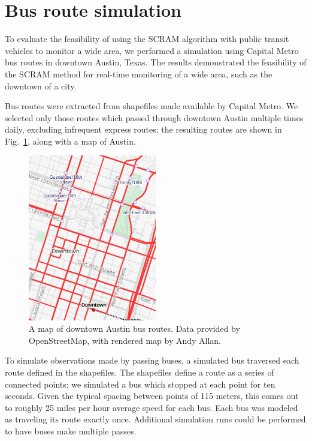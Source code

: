 \section{Bus route simulation}

To evaluate the feasibility of using the SCRAM algorithm with public transit
vehicles to monitor a wide area, we performed a simulation using Capital Metro
bus routes in downtown Austin, Texas. The results demonstrated the feasibility
of the SCRAM method for real-time monitoring of a wide area, such as the
downtown of a city.

Bus routes were extracted from shapefiles made available by Capital
Metro.\cite{capmetro} We selected only those routes which passed through
downtown Austin multiple times daily, excluding infrequent express routes; the
resulting routes are shown in Fig.~\ref{downtown-map}, along with a map of
Austin.

\begin{figure}
  \centering
  \includegraphics[width=0.5\textwidth]{figures/downtown-transport-map.png}
  \caption{A map of downtown Austin bus routes. Data provided by
    OpenStreetMap,\cite{osm} with rendered map by Andy Allan.}
  \label{downtown-map}
\end{figure}

To simulate observations made by passing buses, a simulated bus traversed each
route defined in the shapefiles. The shapefiles define a route as a series of
connected points; we simulated a bus which stopped at each point for ten
seconds. Given the typical spacing between points of 115 meters, this comes out
to roughly 25 miles per hour average speed for each bus. Each bus was modeled as
traveling its route exactly once. Additional simulation runs could be performed
to have buses make multiple passes.

